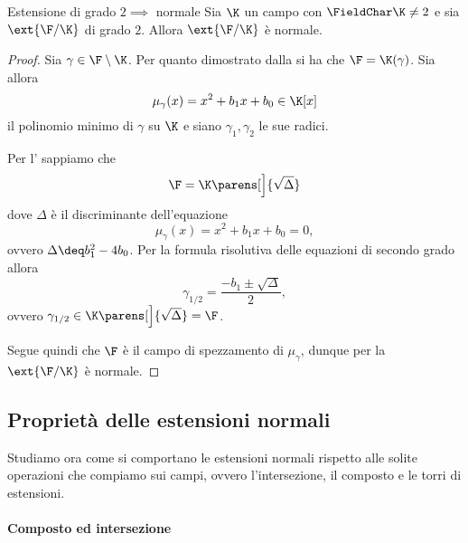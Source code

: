 \begin{proposition}
    {Estensione di grado $2 \implies$ normale}{}
    Sia $\K$ un campo con $\FieldChar \K \neq 2$ e sia $\ext{\F / \K}$ di grado $2$. Allora $\ext{\F / \K}$ è normale.   
\end{proposition}
\begin{proof}
    Sia $\gamma \in \F \setminus \K$. Per quanto dimostrato dalla  si ha che $\F = \K(\gamma)$. Sia allora \[
        \mu_\gamma(x) = x^2 + b_1x + b_0 \in \K[x]
    \]il polinomio minimo di $\gamma$ su $\K$ e siano $\gamma_1, \gamma_2$ le sue radici.
    
    Per l' sappiamo che \[
        \F = \K\parens[\Big]{\sqrt{\Delta}}
    \] dove $\Delta$ è il discriminante dell'equazione \[
        \mu_\gamma(x) = x^2 + b_1x + b_0 = 0, 
    \] ovvero $\Delta \deq b_1^2 - 4b_0$. Per la formula risolutiva delle equazioni di secondo grado allora \[
        \gamma_{1/2} = \frac{-b_1 \pm \sqrt{\Delta}}{2},
    \] ovvero $\gamma_{1/2} \in \K\parens[\Big]{\sqrt{\Delta}} = \F$.
    
    Segue quindi che $\F$ è il campo di spezzamento di $\mu_\gamma$, dunque per la  $\ext{\F / \K}$ è normale.  
\end{proof}

\subsection{Proprietà delle estensioni normali}

Studiamo ora come si comportano le estensioni normali rispetto alle solite operazioni che compiamo sui campi, ovvero l'intersezione, il composto e le torri di estensioni.

\paragraph{Composto ed intersezione}

